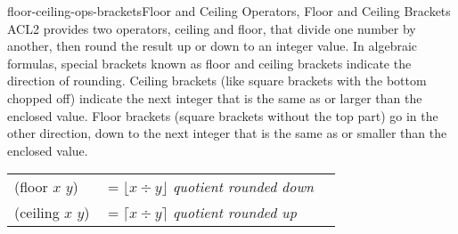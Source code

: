 \begin{aside}{floor-ceiling-ops-brackets}{Floor and Ceiling Operators, Floor and Ceiling Brackets}
ACL2 provides two operators,
\textsf{ceiling} and \textsf{floor}, that divide one number by another,
then round the result up or down to an integer value.
In algebraic formulas, special brackets known as
floor and ceiling brackets indicate the direction of rounding.
Ceiling brackets (like square brackets with the bottom chopped off)
indicate the next integer that is the same as or larger than
the enclosed value.
Floor brackets (square brackets without the top part)
go in the other direction, down to the next integer
that is the same as or smaller than the enclosed value.
\vspace{2mm}
\begin{center}
\begin{tabular}{lll}
\textsf{(floor $x$ $y$)}  & $= \lfloor x \div y \rfloor$ \emph{quotient rounded down} \vspace{1mm}\\
\textsf{(ceiling $x$ $y$)}& $= \lceil x  \div y \rceil $ \emph{quotient rounded up}   \\
\end{tabular}
\end{center}
\end{aside}


